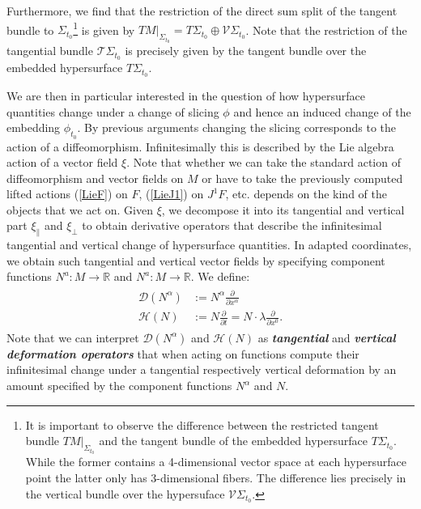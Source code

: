 \documentclass[a4paper,12pt, DIV=14, BCOR=5mm, twoside, headsepline, numbers=noenddot]{scrbook}
\begin{document}
Furthermore, we find that the restriction of the direct sum split of the tangent bundle to $\Sigma_{t_0}$\footnote{It is important to observe the difference between the restricted tangent bundle $TM\vert_{\Sigma_{t_0}}$ and the tangent bundle of the embedded hypersurface $T\Sigma_{t_0}$. While the former contains a 4-dimensional vector space at each hypersurface point the latter only has 3-dimensional fibers. The difference lies precisely in the vertical bundle over the hypersuface $\mathcal{V}\Sigma_{t_0}$.} is given by $TM \vert _{\Sigma_{t_0}} = T\Sigma _{t_0} \oplus \mathcal{V}\Sigma _{t_0}$. Note that the restriction of the tangential bundle $\mathcal{T}\Sigma_{t_0}$ is precisely given by the tangent bundle over the embedded hypersurface $T\Sigma_{t_0}$.

We are then in particular interested in the question of how hypersurface quantities change under a change of slicing $\phi$ and hence an induced change of the embedding $\phi_{t_0}$. By previous arguments changing the slicing corresponds to the action of a diffeomorphism. Infinitesimally this is described by the Lie algebra action of a vector field $\xi$. Note that whether we can take the standard action of diffeomorphism and vector fields on $M$ or have to take the previously computed lifted actions (\ref{LieF}) on $F$, (\ref{LieJ1}) on $J^1F$, etc. depends on the kind of the objects that we act on.  Given $\xi$, we decompose it into its tangential and vertical part $\xi_{\parallel}$ and $\xi_{\perp}$ to obtain derivative operators that describe the infinitesimal tangential and vertical change of hypersurface quantities.  In adapted coordinates, we obtain such tangential and vertical vector fields by specifying component functions
 $N^a : M \rightarrow \mathbb{R}$ and $N^a : M \rightarrow \mathbb{R}$. We define: 
\begin{align}
    \begin{aligned}
    \mathcal{D}(N^{\alpha}) &:= N^{\alpha} \frac{\partial}{\partial x^{\alpha}} \\
    \mathcal{H}(N) &:= N \frac{\partial}{\partial t} = N \cdot \lambda \frac{\partial}{\partial x^0}.
    \end{aligned}
\end{align} 
Note that we can interpret $\mathcal{D}(N^\alpha)$ and $\mathcal{H}(N)$ as \textit{\textbf{tangential}} and \textit{\textbf{vertical deformation operators}} that when acting on functions compute their infinitesimal change under a tangential respectively vertical deformation by an amount specified by the component functions $N^{\alpha}$ and $N$.
\end{document}

